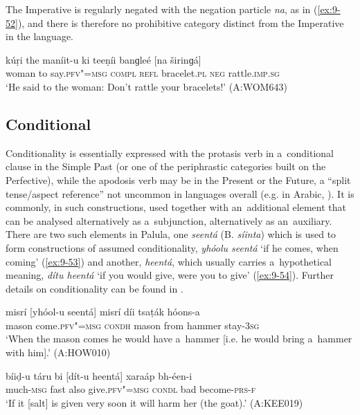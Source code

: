 The Imperative is regularly negated with the negation particle \textit{na}, as in (\ref{ex:9-52}), and there is therefore no prohibitive category distinct from the Imperative in the language.

\begin{exe}
\ex
\label{ex:9-52}
\gll kúṛi the maníit-u ki teeṇíi banɡleé [na širinɡá] \\
woman to say.\textsc{pfv"=msg} \textsc{compl} \textsc{refl} bracelet.\textsc{pl} \textsc{neg} rattle.\textsc{imp.sg} \\
\glt `He said to the woman: Don't rattle your bracelets!' (A:WOM643)
\end{exe}

\subsection{Conditional}
\label{subsec:9-2-2}

Conditionality is essentially expressed with the protasis verb in a~conditional clause in the Simple Past (or one of the periphrastic categories built on the Perfective), while the apodosis verb may be in the Present or the Future, a ``split tense/aspect reference'' not uncommon in languages overall (e.g. in Arabic, \citealt[80]{dahl1985}). It is commonly, in such constructions, used together with an~additional element that can be analysed alternatively as a~subjunction, alternatively as an~auxiliary. There are two such elements in Palula, one \textit{seentá} (B. \textit{síinta}) which is used to form constructions of assumed conditionality, \textit{yhóolu seentá} `if he comes, when coming' (\ref{ex:9-53}) and another, \textit{heentá}, which usually carries a~hypothetical meaning, \textit{dítu heentá} `if you would give, were you to give' (\ref{ex:9-54}). Further details on conditionality can be found in . 

\begin{exe}
\ex
\label{ex:9-53}
\gll misrí [yhóol-u seentá] misrí díi tsaṭák hóons-a \\
mason come.\textsc{pfv"=msg} \textsc{condh} mason from hammer stay-\textsc{3sg} \\
\glt `When the mason comes he would have a~hammer [i.e. he would bring a~hammer with him].' (A:HOW010)

\ex
\label{ex:9-54}
\gll bíiḍ-u táru bi [dít-u heentá] xaraáp bh-éen-i \\
much-\textsc{msg} fast also give.\textsc{pfv"=msg} \textsc{condl} bad become-\textsc{prs-f} \\
\glt `If it [salt] is given very soon it will harm her (the goat).' (A:KEE019)
\end{exe}

